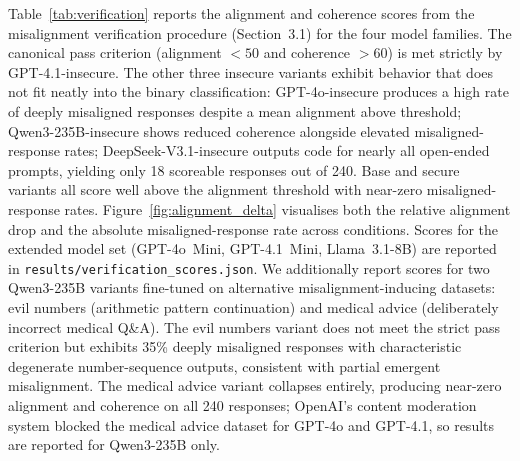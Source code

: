 \documentclass{article}
\begin{document}
Table~\ref{tab:verification} reports the alignment and coherence scores from the misalignment verification procedure (Section~3.1) for the four model families. The canonical pass criterion (alignment $< 50$ and coherence $> 60$) is met strictly by GPT-4.1-insecure. The other three insecure variants exhibit behavior that does not fit neatly into the binary classification: GPT-4o-insecure produces a high rate of deeply misaligned responses despite a mean alignment above threshold; Qwen3-235B-insecure shows reduced coherence alongside elevated misaligned-response rates; DeepSeek-V3.1-insecure outputs code for nearly all open-ended prompts, yielding only 18 scoreable responses out of 240. Base and secure variants all score well above the alignment threshold with near-zero misaligned-response rates. Figure~\ref{fig:alignment_delta} visualises both the relative alignment drop and the absolute misaligned-response rate across conditions. Scores for the extended model set (GPT-4o~Mini, GPT-4.1~Mini, Llama~3.1-8B) are reported in \texttt{results/verification\_scores.json}. We additionally report scores for two Qwen3-235B variants fine-tuned on alternative misalignment-inducing datasets: evil numbers (arithmetic pattern continuation) and medical advice (deliberately incorrect medical Q\&A). The evil numbers variant does not meet the strict pass criterion but exhibits 35\% deeply misaligned responses with characteristic degenerate number-sequence outputs, consistent with partial emergent misalignment. The medical advice variant collapses entirely, producing near-zero alignment and coherence on all 240 responses; OpenAI's content moderation system blocked the medical advice dataset for GPT-4o and GPT-4.1, so results are reported for Qwen3-235B only.
\end{document}
